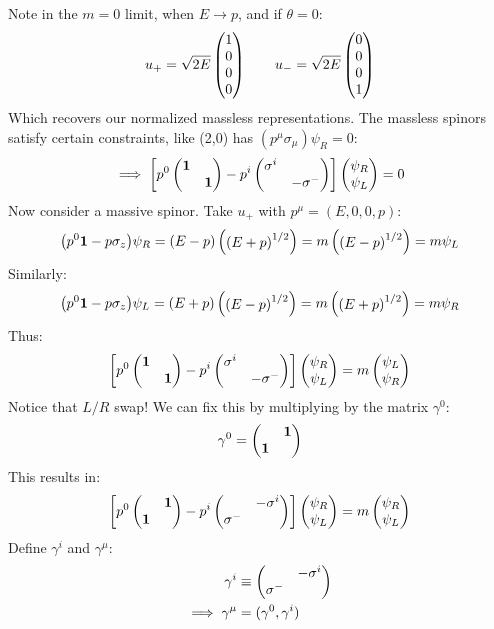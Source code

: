 Note in the $m=0$ limit, when $E\to p$, and if $\theta=0$:
\begin{align*}
  u_+=\sqrt{2E}\pmqty{1\\0\\0\\0}\qquad
  u_-=\sqrt{2E}\pmqty{0\\0\\0\\1}
\end{align*}
Which recovers our normalized massless representations. The massless spinors satisfy certain constraints, like (2,0) has $(p^\mu\sigma_\mu)\psi_R=0$:
\begin{align*}
  \implies\qty[p^0\pmqty{\bm{1}\\&\bm{1}}-p^i\pmqty{\sigma^i\\&-\sigma^-}]
  \pmqty{\psi_R\\\psi_L}=0
\end{align*}
Now consider a massive spinor. Take $u_+$ with $p^\mu=(E,0,0,p)$:
\begin{align*}
  \qty(p^0\bm{1}-p\sigma_z)\psi_R=
  (E-p)\pmqty{{(E+p)}^{1/2}}=m\pmqty{{(E-p)}^{1/2}}
  =m\psi_L
\end{align*}
Similarly:
\begin{align*}
  \qty(p^0\bm{1}-p\sigma_z)\psi_L
  =(E+p)\pmqty{{(E-p)}^{1/2}}=m\pmqty{{(E+p)}^{1/2}}
  =m\psi_R
\end{align*}
Thus:
\begin{align*}
  \qty[p^0\pmqty{\bm{1}\\&\bm{1}}-p^i\pmqty{\sigma^i\\&-\sigma^-}]
  \pmqty{\psi_R\\\psi_L}=m\pmqty{\psi_L\\\psi_R}
\end{align*}
Notice that $L/R$ swap! We can fix this by multiplying by the matrix $\gamma^0$:
\begin{align*}
  \gamma^0=\pmqty{&\bm{1}\\\bm{1}}
\end{align*}
This results in:
\begin{align*}
  \qty[p^0\pmqty{&\bm{1}\\\bm{1}}-p^i\pmqty{&-\sigma^i\\\sigma^-}]
  \pmqty{\psi_R\\\psi_L}=m\pmqty{\psi_R\\\psi_L}
\end{align*}
Define $\gamma^i$ and $\gamma^\mu$:
\begin{align*}
  \gamma^i&\equiv\pmqty{&-\sigma^i\\\sigma^-}\\
  \implies\gamma^\mu&=(\gamma^0,\gamma^i)
\end{align*}
